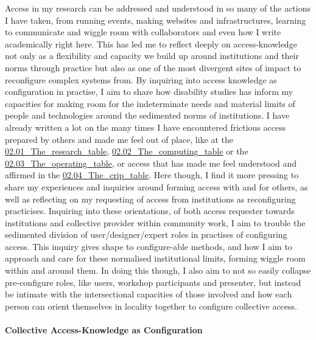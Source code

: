 Access in my research can be addressed and understood in so many of the
actions I have taken, from running events, making websites and
infrastructures, learning to communicate and wiggle room with
collaborators and even how I write academically right here. This has led
me to reflect deeply on access-knowledge not only as a flexibility and
capacity we build up around institutions and their norms through
practice but also as one of the most divergent sites of impact to
reconfigure complex systems from. By inquiring into access knowledge as
configuration in practise, I aim to share how disability studies has
inform my capacities for making room for the indeterminate needs and
material limits of people and technologies around the sedimented norms
of institutions. I have already written a lot on the many times I have
encountered frictious access prepared by others and made me feel out of
place, like at the
\href{../../02_Crip-Tic_of_Vignettes/sections/02.01_The_research_table.md}{02.01\_The\_research\_table},
\href{../../02_Crip-Tic_of_Vignettes/sections/02.02_The_computing_table.md}{02.02\_The\_computing\_table}
or the
\href{../../02_Crip-Tic_of_Vignettes/sections/02.03_The_operating_table.md}{02.03\_The\_operating\_table},
or access that has made me feel understood and affirmed in the
\href{../../02_Crip-Tic_of_Vignettes/sections/02.04_The_crip_table.md}{02.04\_The\_crip\_table}.
Here though, I find it more pressing to share my experiences and
inquiries around forming access with and for others, as well as
reflecting on my requesting of access from institutions as reconfiguring
practicises. Inquiring into these orientations, of both access requester
towards institutions and collective provider within community work, I
aim to trouble the sedimented division of user/designer/expert roles in
practises of configuring access. This inquiry gives shape to
configure-able methods, and how I aim to approach and care for these
normalised institutional limits, forming wiggle room within and around
them. In doing this though, I also aim to not so easily collapse
pre-configure roles, like users, workshop participants and presenter,
but instead be intimate with the intersectional capacities of those
involved and how each person can orient themselves in locality together
to configure collective access.

\hypertarget{collective-access-knowledge-as-configuration}{%
\paragraph{Collective Access-Knowledge as
Configuration}\label{collective-access-knowledge-as-configuration}}

